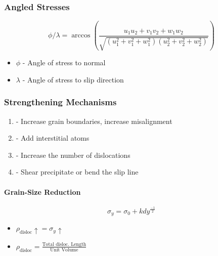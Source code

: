 		\subsubsection{Angled Stresses} \label{subsubsec:Angled Stresses}
			\begin{equation} \label{eq:Angled Stresses}
				\phi / \lambda = \arccos \left( \frac{u_{1}u_{2} + v_{1}v_{2} + w_{1}w_{2}}{\sqrt{\left( u_{1}^{2} + v_{1}^{2} + w_{1}^{2} \right) \left( u_{2}^{2} + v_{2}^{2} + w_{2}^{2} \right)}} \right)
			\end{equation}
			\begin{itemize}[noitemsep]
				\item $\phi$ - Angle of stress to normal
				\item $\lambda$ - Angle of stress to slip direction
			\end{itemize}
		
		\subsubsection{Strengthening Mechanisms} \label{subsubsec:Strengthening Mechanisms}
			\begin{enumerate}[noitemsep]
				\item {} - Increase grain boundaries, increase misalignment
				
				\item {} - Add interstitial atoms
				
				\item {} - Increase the number of dislocations
				
				\item {} - Shear precipitate or bend the slip line
			\end{enumerate}
		
			\paragraph{Grain-Size Reduction} \label{par:Grain-Size Reduction}
				\begin{equation} \label{eq:Grain-Size Reduction}
					\sigma_{y} = \sigma_{0} + kdy^{\frac{-1}{2}}
				\end{equation}
				\begin{itemize}[noitemsep]
					\item $\rho_{\text{disloc}} \uparrow = \sigma_{y} \uparrow$
					\item $\rho_{\text{disloc}} = \frac{\text{Total disloc. Length}}{\text{Unit Volume}}$
				\end{itemize}
			
